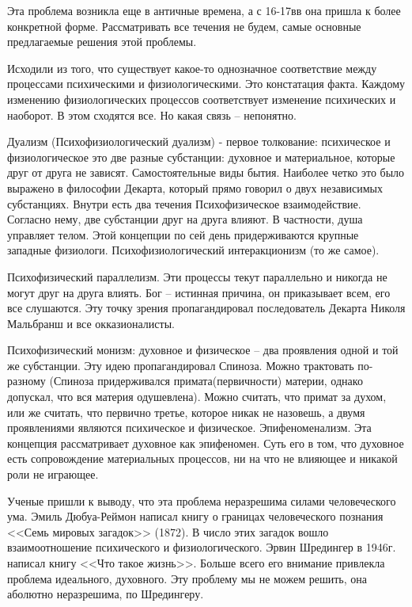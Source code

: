 Эта проблема возникла еще в античные времена, а с 16-17вв она пришла к более конкретной форме. Рассматривать все течения не будем, самые основные предлагаемые решения этой проблемы.

Исходили из того, что существует какое-то однозначное соответствие между процессами психическими и физиологическими. Это констатация факта. Каждому изменению физиологических процессов соответствует изменение психических и наоборот. В этом сходятся все. Но какая связь – непонятно.

    Дуализм (Психофизиологический дуализм) - первое толкование: психическое и физиологическое это две разные субстанции: духовное и материальное, которые друг от друга не зависят. Самостоятельные виды бытия. Наиболее четко это было выражено в философии Декарта, который прямо говорил о двух независимых субстанциях. Внутри есть два течения
    Психофизическое взаимодействие. Согласно нему, две субстанции друг на друга влияют. В частности, душа управляет телом. Этой концепции по сей день придерживаются крупные западные физиологи. Психофизиологический интеракционизм (то же самое).

    Психофизический параллелизм. Эти процессы текут параллельно и никогда не могут друг на друга влиять. Бог – истинная причина, он приказывает всем, его все слушаются. Эту точку зрения пропагандировал последователь Декарта Николя Мальбранш и все окказионалисты.

    Психофизический монизм: духовное и физическое – два проявления одной и той же субстанции. Эту идею пропагандировал Спиноза. Можно трактовать по-разному (Спиноза придерживался примата(первичности) материи, однако допускал, что вся материя одушевлена). Можно считать, что примат за духом, или же считать, что первично третье, которое никак не назовешь, а двумя проявлениями являются психическое и физическое.
    Эпифеноменализм. Эта концепция рассматривает духовное как эпифеномен. Суть его в том, что духовное есть сопровождение материальных процессов, ни на что не влияющее и никакой роли не играющее.

Ученые пришли к выводу, что эта проблема неразрешима силами человеческого ума. Эмиль Дюбуа-Реймон написал книгу о границах человеческого познания <<Семь мировых загадок>> (1872). В число этих загадок вошло взаимоотношение психического и физиологического. Эрвин Шредингер в 1946г. написал книгу <<Что такое жизнь>>. Больше всего его внимание привлекла проблема идеального, духовного. Эту проблему мы не можем решить, она аболютно неразрешима, по Шредингеру.

